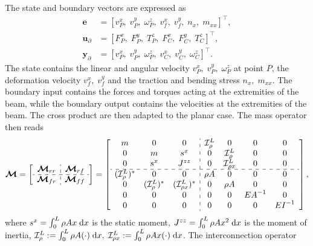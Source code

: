 \documentclass{svjour3}                     %
\begin{document}
The state and boundary vectors are expressed as
\begin{align*}
\bm{e} &= [v_P^x, \; v_P^y, \; \omega_P^z, \; v_f^x, \; v_f^y, \; n_x, \; m_{xx}]^\top, \\
\bm{u}_\partial &=  [F_{P}^x, \; F_{P}^y, \; T_{P}^z, \; F_{C}^x, \; F_{C}^y, \; T_{C}^z]^\top, \\
\bm{y}_\partial &=  [v_{P}^x, \; v_{P}^y, \; \omega_{P}^z, \; v_{C}^x, \; v_{C}^y, \; \omega_{C}^z]^\top.
\end{align*}
The state contains the linear and angular velocity $v_P^x, \; v_P^y, \; \omega_P^z$ at point $P$, the deformation velocity $ v_f^x, \; v_f^y$ and the traction and bending stress $n_x, \; m_{xx}$. The boundary input contains the forces and torques acting at the extremities of the beam, while the boundary output contains the velocities at the extremities of the beam.
The cross product are then adapted to the planar case. The mass operator then reads
\begin{equation}
\label{eq:EB_M}
\bm{\mathcal{M}} = 
\left[ \begin{array}{c:c}
\bm{\mathcal{M}}_{rr} & \bm{\mathcal{M}}_{rf} \\
\hdashline
\bm{\mathcal{M}}_{fr} & \bm{\mathcal{M}}_{ff} \\
\end{array} \right] = 
\left[ \begin{array}{ccc:cccc}
m & 0 & 0 & \mathcal{I}_\rho^L & 0 & 0 & 0 \\
0 & m & s^x & 0 & \mathcal{I}_\rho^L & 0 & 0 \\
0 & s^x & J^{zz} & 0 & \mathcal{I}_{\rho x}^{L} & 0 & 0 \\
\hdashline 
(\mathcal{I}_\rho^{L})^* & 0 & 0 & \rho A & 0 & 0 & 0  \\
0 & (\mathcal{I}_\rho^{L})^* & (\mathcal{I}_{\rho x}^{L})^* & 0 & \rho A & 0 & 0  \\
0 & 0 & 0 & 0 & 0 & {EA}^{-1} & 0 \\
0 & 0 & 0 & 0 & 0 & 0 & {EI}^{-1} \\
\end{array} \right],
\end{equation}
where  $s^x = \int_{0}^{L} \rho A x \d{x}$ is the static moment, $J^{zz} = \int_{0}^{L} \rho A x^2 \d{x}$ is the moment of inertia, $\mathcal{I}_\rho^L := \int_{0}^L \rho A (\cdot) \d{x}, \; \mathcal{I}_{\rho x}^L := \int_{0}^L \rho A x (\cdot) \d{x}$. The interconnection operator 
\end{document}
